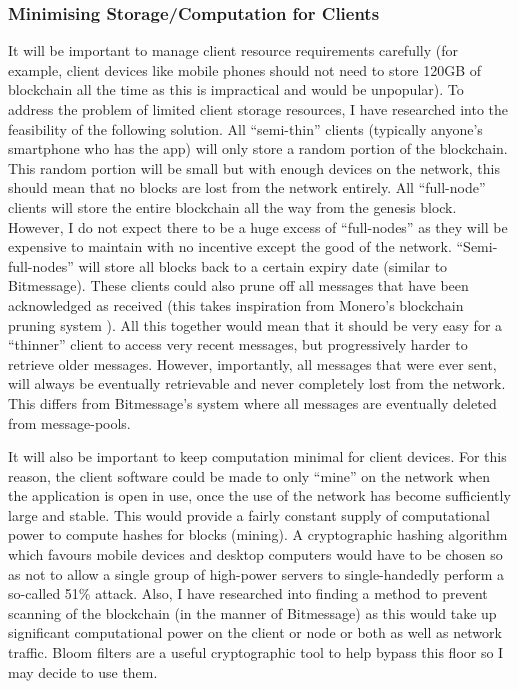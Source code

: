 \documentclass{article}
\begin{document}
\subsubsection{Minimising Storage/Computation for Clients}
It will be important to manage client resource requirements carefully (for example, client devices like mobile phones should not need to store 120GB of blockchain all the time as this is impractical and would be unpopular). To address the problem of limited client storage resources, I have researched into the feasibility of the following solution. All ``semi-thin'' clients (typically anyone's smartphone who has the app) will only store a random portion of the blockchain. This random portion will be small but with enough devices on the network, this should mean that no blocks are lost from the network entirely. All ``full-node'' clients will store the entire blockchain all the way from the genesis block. However, I do not expect there to be a huge excess of ``full-nodes'' as they will be expensive to maintain with no incentive except the good of the network.
``Semi-full-nodes'' will store all blocks back to a certain expiry date (similar to Bitmessage). These clients could also prune off all messages that have been acknowledged as received (this takes inspiration from Monero's blockchain pruning system \cite{monero_pruning}). All this together would mean that it should be very easy for a ``thinner'' client to access very recent messages, but progressively harder to retrieve older messages. However, importantly, all messages that were ever sent, will always be eventually retrievable and never completely lost from the network. This differs from Bitmessage's system where all messages are eventually deleted from message-pools.

It will also be important to keep computation minimal for client devices. For this reason, the client software could be made to only ``mine'' on the network when the application is open in use, once the use of the network has become sufficiently large and stable. This would provide a fairly constant supply of computational power to compute hashes for blocks (mining). A cryptographic hashing algorithm which favours mobile devices and desktop computers would have to be chosen so as not to allow a single group of high-power servers to single-handedly perform a so-called 51\% attack\cite{51_attack}. Also, I have researched into finding a method to prevent scanning of the blockchain (in the manner of Bitmessage) as this would take up significant computational power on the client or node or both as well as network traffic. Bloom filters are a useful cryptographic tool to help bypass this floor so I may decide to use them.
\end{document}

